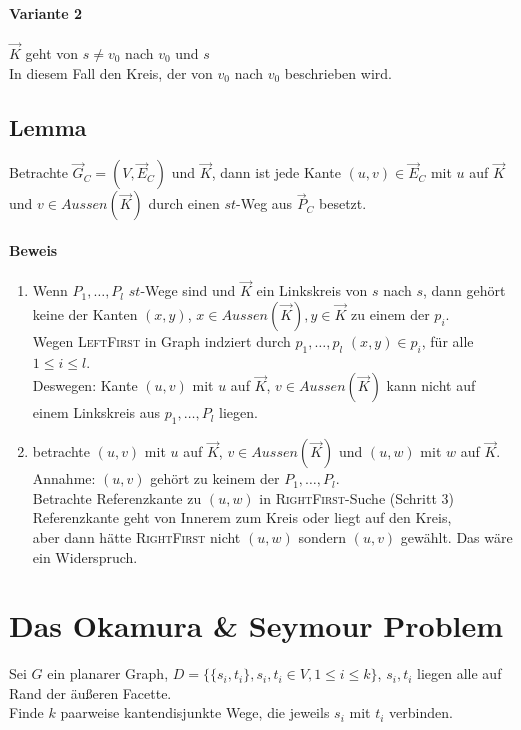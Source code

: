 \documentclass{article}
\begin{document}
\paragraph{Variante 2}
$\overrightarrow{K}$ geht von $s \neq v_0$ nach $v_0$ und $s$\\
In diesem Fall den Kreis, der von $v_0$ nach $v_0$ beschrieben wird.

\subsection{Lemma}
Betrachte $\overrightarrow{G}_C = (V,\overrightarrow{E}_C)$ und $\overrightarrow{K}$, dann ist jede Kante $(u,v) \in \overrightarrow{E}_C$ mit $u$ auf $\overrightarrow{K}$ und $v \in Aussen(\overrightarrow{K})$ durch einen $st$-Weg aus $\overrightarrow{P}_C$ besetzt.

\paragraph{Beweis}
\begin{enumerate}
	\item Wenn $P_1,\ldots, P_l$ $st$-Wege sind und $\overrightarrow{K}$ ein Linkskreis von $s$ nach $s$, dann gehört keine der Kanten $(x,y)$, $x \in Aussen(\overrightarrow{K}), y \in \overrightarrow{K}$ zu einem der $p_i$.\\
	Wegen \textsc{LeftFirst} in Graph indziert durch $p_1,\ldots, p_l$ $(x,y) \in p_i$, für alle $1 \leq i \leq l$.\\
	Deswegen: Kante $(u,v)$ mit $u$ auf $\overrightarrow{K}$, $v \in Aussen(\overrightarrow{K})$ kann nicht auf einem Linkskreis aus $p_1,\ldots, P_l$ liegen.
	
	\item betrachte $(u,v)$ mit $u$ auf $\overrightarrow{K}$, $v \in Aussen(\overrightarrow{K})$ und $(u,w)$ mit $w$ auf $\overrightarrow{K}$.\\
	Annahme: $(u,v)$ gehört zu keinem der $P_1, \ldots, P_l$.\\
	Betrachte Referenzkante zu $(u,w)$ in \textsc{RightFirst}-Suche (Schritt 3)\\
	Referenzkante geht von Innerem zum Kreis oder liegt auf den Kreis,\\
	aber dann hätte \textsc{RightFirst} nicht $(u,w)$ sondern $(u,v)$ gewählt. Das wäre ein Widerspruch.
\end{enumerate}


\section{Das Okamura \& Seymour Problem}
Sei $G$ ein planarer Graph, $D = \{\{s_i,t_i\}, s_i,t_i \in V, 1 \leq i \leq k \}$, $s_i, t_i$ liegen alle auf Rand der äußeren Facette.\\
Finde $k$ paarweise kantendisjunkte Wege, die jeweils $s_i$ mit $t_i$ verbinden.
\end{document}
